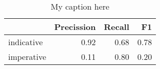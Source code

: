 \begin{table}[!ht]
\centering
\begin{tabular}{lrrr}
\toprule
{} &  Precission &  Recall &   F1 \\
\midrule
indicative &        0.92 &    0.68 & 0.78 \\
imperative &        0.11 &    0.80 & 0.20 \\
\bottomrule
\end{tabular}
\caption{My caption here}
\label{tab:MOOD-ocd-combined-F1}
\end{table}